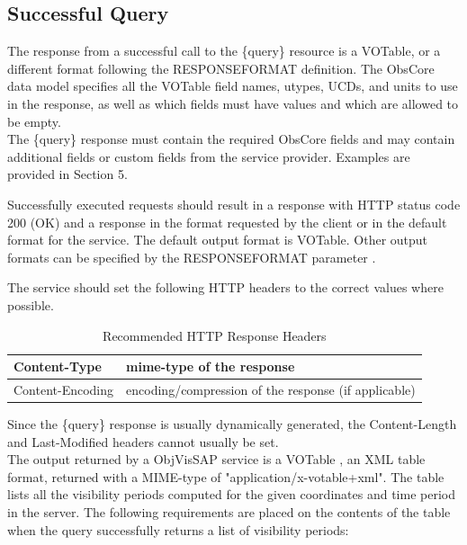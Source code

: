 \documentclass[11pt,a4paper]{ivoa}
\begin{document}
\subsection{Successful Query}
The response from a successful call to the \{query\} resource is a
VOTable, or a different format following the RESPONSEFORMAT definition.
The ObsCore data model specifies all the VOTable \citep{2019ivoa.spec.1021O}
field names, utypes, UCDs, and units to use in the response, as well
as which fields must have values and which are allowed to be empty.\\
The \{query\} response must contain the required ObsCore \citep{2017ivoa.spec.0509L}
fields and may contain additional fields or custom fields from the service
provider. Examples are provided in Section 5.\par

Successfully executed requests should result in a response with HTTP
status code 200 (OK) and a response in the format requested by the
client or in the default format for the service. The default output
format is VOTable. Other output formats can be specified by the
RESPONSEFORMAT parameter \citep{2017ivoa.spec.0517D}.\par

The service should set the following HTTP headers to the correct values
where possible.

\begin{table}[h]
\centering
\begin{tabular}{|l|l|}
\hline
Content-Type & mime-type of the response \\
\hline
Content-Encoding & encoding/compression of the response (if applicable)
\\
\hline
\end{tabular}
\caption{Recommended HTTP Response Headers}
\end{table}
\par
Since the \{query\} response is usually dynamically generated, the
Content-Length and Last-Modified headers cannot usually be set.\\

The output returned by a ObjVisSAP service is a VOTable , an XML table
format, returned with a MIME-type of "application/x-votable+xml". The
table lists all the visibility periods computed for the given
coordinates and time period in the server. The following requirements
are placed on the contents of the table when the query successfully
returns a list of visibility periods:
\end{document}

